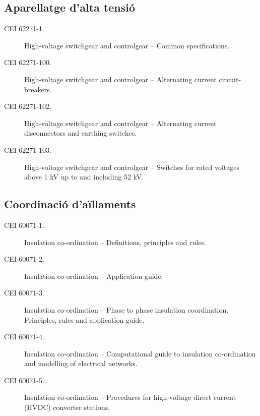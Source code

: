 \subsection*{Aparellatge d'alta tensió}
\begin{description}
    \item [\hspace{5mm}CEI 62271-1.] High-voltage switchgear and controlgear -- Common specifications.
    \item [\hspace{5mm}CEI 62271-100.] High-voltage switchgear and controlgear -- Alternating current circuit-breakers.
    \item [\hspace{5mm}CEI 62271-102.] High-voltage switchgear and controlgear -- Alternating current disconnectors and earthing switches.
    \item [\hspace{5mm}CEI 62271-103.] High-voltage switchgear and controlgear -- Switches for rated voltages above 1 kV up to and including 52 kV.
\end{description}

\subsection*{Coordinació d'aïllaments}
\begin{description}
    \item [\hspace{5mm}CEI 60071-1.] Insulation co-ordination -- Definitions, principles and rules.
    \item [\hspace{5mm}CEI 60071-2.] Insulation co-ordination -- Application guide.
    \item [\hspace{5mm}CEI 60071-3.] Insulation co-ordination -- Phase to phase insulation coordination. Principles, rules and application guide.
    \item [\hspace{5mm}CEI 60071-4.] Insulation co-ordination -- Computational guide to insulation co-ordination and modelling of electrical networks.
    \item [\hspace{5mm}CEI 60071-5.] Insulation co-ordination -- Procedures for high-voltage direct current (HVDC) converter stations.
\end{description}


